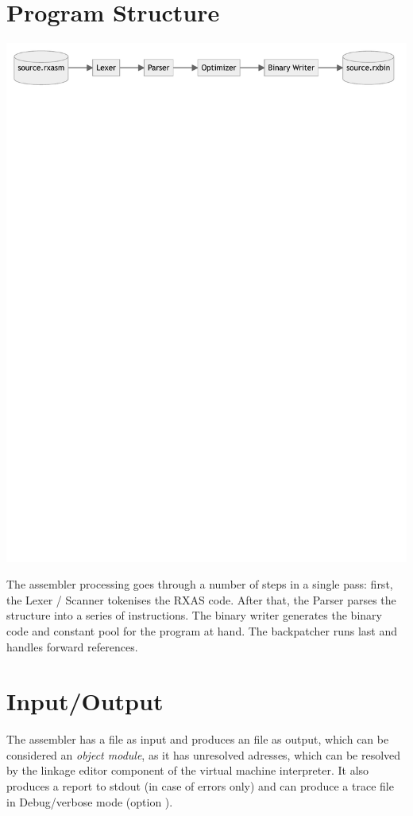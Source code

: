 \section{Program Structure}
\includegraphics[width=\textwidth]{charts/asmstructure.pdf}

The assembler processing goes through a number of steps in a single
pass: first, the Lexer / Scanner tokenises the RXAS code. After that,
the Parser parses the structure into a series of instructions. The
binary writer generates the binary code and constant pool for the
program at hand. The backpatcher runs last and handles forward references.

\section{Input/Output}

The  assembler has a  file as input and
produces an  file as output, which can be considered an
\emph{object module}, as it has unresolved adresses, which can be
resolved by the linkage editor component of the  virtual
machine interpreter. It also produces a report to stdout (in case of
errors only) and can produce a trace file in Debug/verbose mode
(option ).

